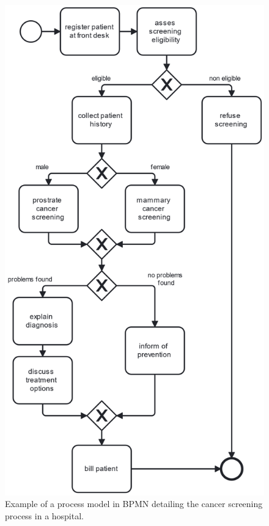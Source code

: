 \begin{figure}[h!]
    \centering
    \includegraphics[width=\textwidth]{gfx/bpmn.png}
    \caption{Example of a process model in BPMN detailing the cancer screening process in a hospital.}
    \label{fig:bpmn_example}
\end{figure}




